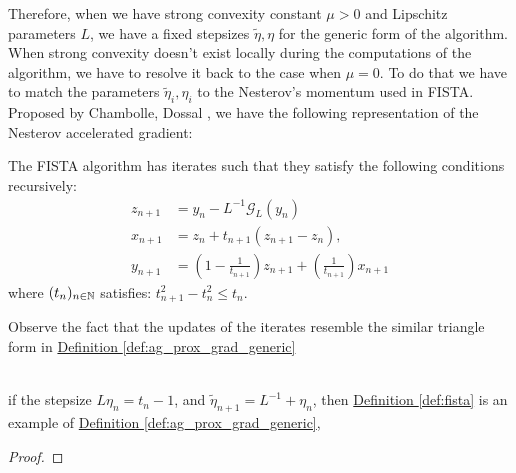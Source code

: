 \documentclass[12pt]{article}
\begin{document}
        \par
        Therefore, when we have strong convexity constant $\mu > 0$ and Lipschitz parameters $L$, we have a fixed stepsizes $\tilde \eta, \eta$ for the generic form of the algorithm. 
        When strong convexity doesn't exist locally during the computations of the algorithm, we have to resolve it back to the case when $\mu = 0$. 
        To do that we have to match the parameters $\tilde \eta_i, \eta_i$ to the Nesterov's momentum used in FISTA. 
        Proposed by Chambolle, Dossal \cite{chambolle_convergence_2015}, we have the following representation of the Nesterov accelerated gradient: 
        \begin{definition}[FISTA]\label{def:fista}
            The FISTA algorithm has iterates such that they satisfy the following conditions recursively: 
            \begin{align*}
                z_{n + 1} &= y_n - L^{-1}\mathcal G_L(y_n)
                \\
                x_{n + 1} &= z_n + t_{n +1} (z_{n + 1} - z_n), 
                \\
                y_{n + 1} &= \left(
                    1 - \frac{1}{t_{n + 1}}
                \right)z_{n + 1} + \left(
                    \frac{1}{t_{n + 1}}
                \right)x_{n + 1}
            \end{align*}
            where $(t_n)_{n\in \mathbb N}$ satisfies: $t_{n + 1}^2 - t_n^2 \le t_n$. 
        \end{definition}
        \begin{observation}
            Observe the fact that the updates of the iterates resemble the similar triangle form in
            \hyperref[def:ag_prox_grad_generic]{Definition \ref*{def:ag_prox_grad_generic}}
        \end{observation}
        \begin{theorem}
        \label{thm:fista_spacial_case_of_similar_triangle}
            \;\\
            if the stepsize $L\eta_n = t_n - 1$, and $\tilde \eta_{n + 1} = L^{-1} + \eta_n$, then
            \hyperref[def:fista]{Definition \ref*{def:fista}}
            is an example of 
            \hyperref[def:ag_prox_grad_generic]{Definition \ref*{def:ag_prox_grad_generic}}, 
        \end{theorem}
        \begin{proof}
            
        \end{proof}
        
\end{document}
